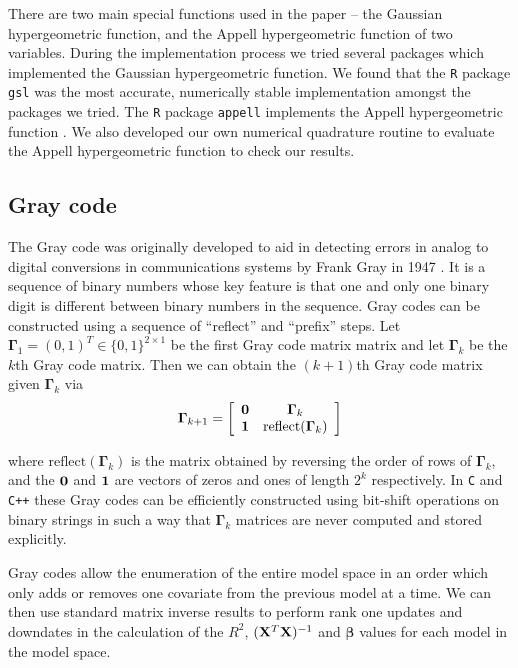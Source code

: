 \documentclass[12pt]{article}
\def\vectorfontone{\bf}
\def\vectorfonttwo{\boldsymbol}
\def\vone{{\vectorfontone 1}}
\def\vzero{{\vectorfontone 0}}
\def\vbeta{{\vectorfonttwo \beta}}               %
\def\matrixfontone{\bf}
\def\matrixfonttwo{\boldsymbol}
\def\mX{{\matrixfontone X}}                      %
\def\mGamma{{\matrixfonttwo \Gamma}}             %
\def\ds{\displaystyle}
\begin{document}
There are two main special functions used in the paper -- the 
Gaussian hypergeometric function, and the Appell hypergeometric function
of two variables. During the 
implementation process we tried several packages which implemented the
Gaussian hypergeometric function.
We found that the {\tt R} package {\tt gsl} \citep{Hankin2006} was the most accurate, numerically
stable implementation amongst the packages we tried. The {\tt R} package {\tt appell}
implements the Appell
hypergeometric function \citep{Bove2013}. We also developed our own numerical quadrature routine to evaluate the Appell
hypergeometric function to check our results.


 
\subsection{Gray code} 
\label{sec:GrayCode}


The Gray code was originally developed to aid in detecting errors in analog to digital conversions in
communications systems by Frank Gray in 1947 \cite[][Section 22.3]{PressEtal2007}. It is a sequence of binary numbers whose key feature is that
one and only one binary digit is different between binary numbers in the sequence. 
Gray codes can be constructed using a sequence of ``reflect'' and ``prefix'' steps.
Let $\mGamma_1 = (0,1)^T \in \{0,1\}^{2\times 1}$ be the first Gray code matrix matrix and let $\mGamma_k$ be the $k$th Gray code matrix. Then we can obtain the $(k+1)$th Gray code matrix given $\mGamma_k$ via 
$$
\ds \mGamma_{k+1} = \left[\begin{array}{cc}
\vzero & \mGamma_k \\
\vone  & \mbox{reflect}(\mGamma_k)
\end{array} \right]
$$ 

\noindent where $\mbox{reflect}(\mGamma_k)$ is the matrix obtained by reversing the order of rows of $\mGamma_k$, and the $\vzero$ and $\vone$ are vectors of zeros and ones
of length $2^k$ respectively. In {\tt C} and {\tt C++} these Gray codes can be efficiently constructed
using bit-shift operations on binary strings in such a way that $\mGamma_{k}$
matrices are never computed and stored explicitly.

Gray codes allow the enumeration of the entire model space in an order which only adds
or removes one covariate from the previous model at a time. We can then use standard matrix
inverse results to perform rank
one updates and downdates in the calculation of the $R^2$, $(\mX^T\mX)^{-1}$ and
$\widehat{\vbeta}$ values for each model in the
model space.
\end{document}
